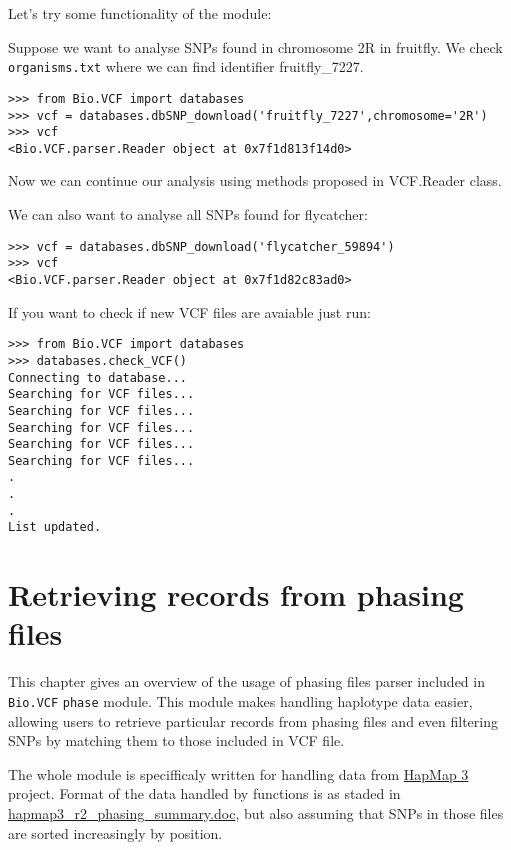\noindent Let's try some functionality of the module:

\noindent Suppose we want to analyse SNPs found in chromosome 2R in fruitfly. We check \verb|organisms.txt| where we can find identifier 
fruitfly\_7227.

\begin{verbatim}
>>> from Bio.VCF import databases
>>> vcf = databases.dbSNP_download('fruitfly_7227',chromosome='2R')
>>> vcf
<Bio.VCF.parser.Reader object at 0x7f1d813f14d0>
\end{verbatim}

\noindent Now we can continue our analysis using methods proposed in VCF.Reader class.

\noindent We can also want to analyse all SNPs found for flycatcher:

\begin{verbatim}
>>> vcf = databases.dbSNP_download('flycatcher_59894')
>>> vcf
<Bio.VCF.parser.Reader object at 0x7f1d82c83ad0>
\end{verbatim}

\noindent If you want to check if new VCF files are avaiable just run:

\begin{verbatim}
>>> from Bio.VCF import databases
>>> databases.check_VCF()
Connecting to database...
Searching for VCF files...
Searching for VCF files...
Searching for VCF files...
Searching for VCF files...
Searching for VCF files...
.
.
.
List updated.
\end{verbatim}
    
    
\section {Retrieving records from phasing files}

This chapter gives an overview of the usage of phasing files parser included in \verb|Bio.VCF| \verb|phase| module.
This module makes handling haplotype data easier, allowing users to retrieve particular records from phasing files
and even filtering SNPs by matching them to those included in VCF file.

The whole module is specifficaly written for handling data from \href{ftp://ftp.hapmap.org/hapmap/phasing/2009-02\_phaseIII/HapMap3\_r2/}{HapMap 3} project.
Format of the data handled by functions is as staded in \href{ftp://ftp.hapmap.org/hapmap/phasing/2009-02\_phaseIII/HapMap3\_r2/hapmap3\_r2\_phasing\_summary.doc}{hapmap3\_r2\_phasing\_summary.doc},
but also assuming that SNPs in those files are sorted increasingly by position.


